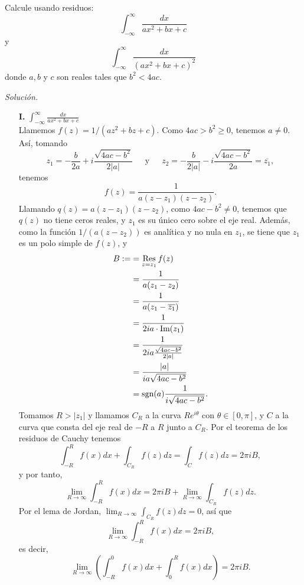 \begin{Ejc}
   Calcule usando residuos:
   $$
   \int_{-\infty}^{\infty}\frac{dx}{ax^2+bx+c} 
   $$
   y
   $$
   \int_{-\infty}^{\infty}\frac{dx}{\left( ax^2+bx+c\right)^2}
   $$
   donde $a, b$ y $c$ son reales tales que $b^2<4ac$.
\end{Ejc}
\textit{Solución.}{
   \begin{itemize}
      \item[\textbf{I.}]$\int_{-\infty}^{\infty}\frac{dx}{ax^2+bx+c}$\\
         Llamemos $f(z)=1/(az^2+bz+c)$. Como $4ac>b^2\geq0$, tenemos $a\neq 0$. Así, tomando
         $$
         z_1=-\frac{b}{2a}+i\frac{\sqrt{4ac-b^2}}{2|a|}\phantom{000}\text{y}\phantom{000}z_2=-\frac{b}{2|a|}-i\frac{\sqrt{4ac-b^2}}{2a}=\overline{z_1},
         $$
         tenemos
         $$
         f(z)=\frac{1}{a(z-z_1)(z-z_2)}.
         $$
         Llamando $q(z)=a(z-z_1)(z-z_2)$, como $4ac-b^2\neq 0$, tenemos que $q(z)$ no tiene ceros reales, y $z_1$ es su único cero sobre el eje real. Además, como la función $1/(a(z-z_2))$ es analítica y no nula en $z_1$, se tiene que $z_1$ es un polo simple de $f(z)$, y
         $$
         \begin{aligned}
            B:=&=\mathop{\mathrm{Res}}\limits_{z=z_1}f(z)\\
               &=\frac{1}{a(z_1-z_2)}\\
               &=\frac{1}{a(z_1-\overline{z_1})}\\
               &=\frac{1}{2ia\cdot\text{Im}(z_1)}\\
               &=\frac{1}{2ia\frac{\sqrt{4ac-b^2}}{2|a|}}\\
               &=\frac{|a|}{ia\sqrt{4ac-b^2}}\\
               &=\normalfont{\text{sgn}}(a)\frac{1}{i\sqrt{4ac-b^2}}.
         \end{aligned}
         $$
         Tomamos $R>|z_1|$ y llamamos $C_R$ a la curva $Re^{i\theta}$ con $\theta\in[0,\pi]$, y $C$ a la curva que consta del eje real de $-R$ a $R$ junto a $C_R$. Por el teorema de los residuos de Cauchy tenemos
         $$
         \int_{-R}^{R}f(x)dx+\int_{C_R}f(z)dz=\int_{C}f(z)dz=2\pi i B,
         $$
         y por tanto,
         $$
         \lim_{R\to\infty}\int_{-R}^{R}f(x)dx=2\pi i B + \lim_{R\to\infty}\int_{C_R}f(z)dz.
         $$
         Por el lema de Jordan, $\lim_{R\to\infty}\int_{C_R} f(z)dz=0$, así que
         $$
         \lim_{R\to\infty}\int_{-R}^{R}f(x)dx=2\pi i B,
         $$
         es decir, 
         $$
         \lim_{R\to\infty}\left( \int_{-R}^{0}f(x)dx+\int_{0}^{R}f(x)dx\right)=2 \pi i B.
$$
\end{itemize}}
